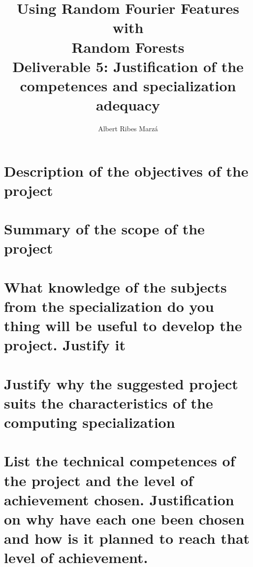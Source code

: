 \documentclass[a4paper]{article}
\title{
Using Random Fourier Features with \\ Random Forests \\
\large Deliverable 5: Justification of the competences and specialization adequacy}
\author{Albert Ribes Marzá}
\begin{document}
    \maketitle
    \pagebreak

    \tableofcontents
    \pagebreak

    \section{Description of the objectives of the project}
    \section{Summary of the scope of the project}
    \section{What knowledge of the subjects from the specialization do you thing will be useful to develop the project. Justify it}
    \section{Justify why the suggested project suits the characteristics of the computing specialization}
    \section{List the technical competences of the project and the level of achievement chosen. Justification on why have each one been chosen and how is it planned to reach that level of achievement.}
\end{document}
